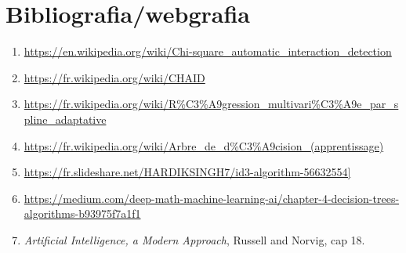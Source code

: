 \documentclass{article}
\begin{document}
\section{Bibliografia/webgrafia}
\begin{enumerate}
  \item{\url{https://en.wikipedia.org/wiki/Chi-square_automatic_interaction_detection}}
  \item{\url{https://fr.wikipedia.org/wiki/CHAID}}
  \item{\url{https://fr.wikipedia.org/wiki/R%C3%A9gression_multivari%C3%A9e_par_spline_adaptative}}
  \item{\url{https://fr.wikipedia.org/wiki/Arbre_de_d%C3%A9cision_(apprentissage)}}
  \item{\url{https://fr.slideshare.net/HARDIKSINGH7/id3-algorithm-56632554]}}
  \item{\url{https://medium.com/deep-math-machine-learning-ai/chapter-4-decision-trees-algorithms-b93975f7a1f1}}
  \item{\textit{Artificial Intelligence, a Modern Approach}, Russell and Norvig, cap 18.}
\end{enumerate}
\end{document}
